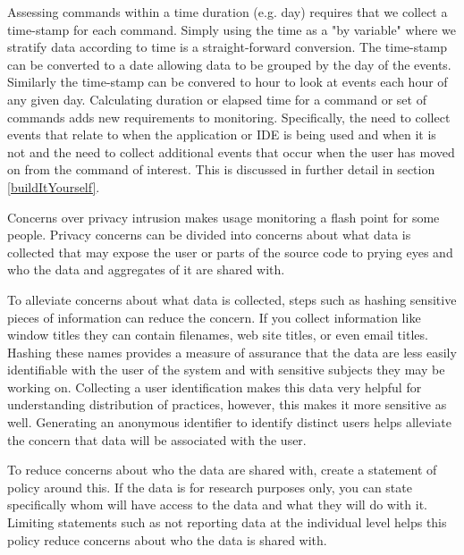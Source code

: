 Assessing commands within a time duration (e.g. day) requires that we collect a time-stamp for each command.  Simply using the time as a "by variable" where we stratify data according to time is a straight-forward conversion.  The time-stamp can be converted to a date allowing data to be grouped by the day of the events.  Similarly the time-stamp can be convered to hour to look at events each hour of any given day.
Calculating duration or elapsed time for a command or set of commands adds new requirements to monitoring.  Specifically, the need to collect events that relate to when the application or IDE is being used and when it is not and the need to collect additional events that occur when the user has moved on from the command of interest.  This is discussed in further detail in section \ref{buildItYourself}.

Concerns over privacy intrusion makes usage monitoring a flash point for some people.  Privacy concerns can be divided into concerns about what data is collected that may expose the user or parts of the source code to prying eyes and who the data and aggregates of it are shared with.  

To alleviate concerns about what data is collected, steps such as hashing sensitive pieces of information can reduce the concern. If you collect information like window titles they can contain filenames, web site titles, or even email titles.  Hashing these names provides a measure of assurance that the data are less easily identifiable with the user of the system and with sensitive subjects they may be working on.   Collecting a user identification makes this data very helpful for understanding distribution of practices, however, this makes it more sensitive as well.  Generating an anonymous identifier to identify distinct users helps alleviate the concern that data will be associated with the user.

To reduce concerns about who the data are shared with, create a statement of policy around this.  If the data is for research purposes only, you can state specifically whom will have access to the data and what they will do with it.  Limiting statements such as not reporting data at the individual level helps this policy reduce concerns about who the data is shared with.


